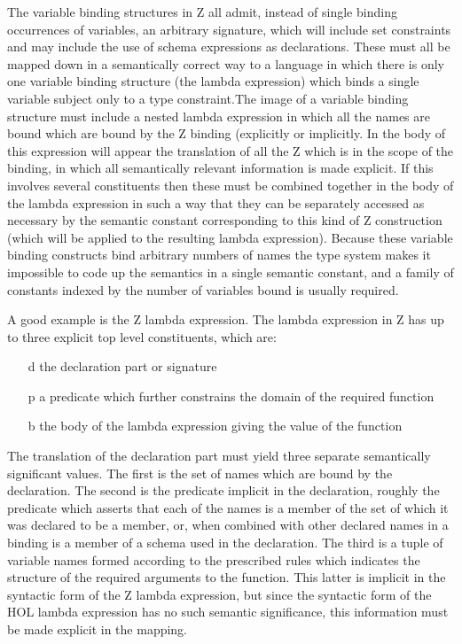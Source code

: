 \documentclass[10pt,titlepage]{book}
\begin{document}
The variable binding structures in Z all admit, instead of single binding occurrences of variables, an arbitrary signature, which will include set constraints and may include the use of schema expressions as declarations.
These must all be mapped down in a semantically correct way to a language in which there is only one variable binding structure (the lambda expression) which binds a single variable subject only to a type constraint.The image of a variable binding structure must include a nested lambda expression in which all the names are bound which are bound by the Z binding (explicitly or implicitly.
In the body of this expression will appear the translation of all the Z which is in the scope of the binding, in which all semantically relevant information is made explicit.
If this involves several constituents then these must be combined together in the body of the lambda expression in such a way that they can be separately accessed as necessary by the semantic constant corresponding to this kind of Z construction (which will be applied to the resulting lambda expression).
Because these variable binding constructs bind arbitrary numbers of names the type system makes it impossible to code up the semantics in a single semantic constant, and a family of constants indexed by the number of variables bound is usually required.

A good example is the Z lambda expression.
The lambda expression in Z has up to three explicit top level constituents, which are:
\begin{itemize}
\item[d] the declaration part or signature
\item[p] a predicate which further constrains the domain of the required function
\item[b] the body of the lambda expression giving the value of the function
\end{itemize}

The translation of the declaration part must yield three separate semantically significant values.
The first is the set of names which are bound by the declaration.
The second is the predicate implicit in the declaration, roughly the predicate which asserts that each of the names is a member of the set of which it was declared to be a member, or, when combined with other declared names in a binding is a member of a schema used in the declaration.
The third is a tuple of variable names formed according to the prescribed rules which indicates the structure of the required arguments to the function.
This latter is implicit in the syntactic form of the Z lambda expression, but since the syntactic form of the HOL lambda expression has no such semantic significance, this information must be made explicit in the mapping.
\end{document}
